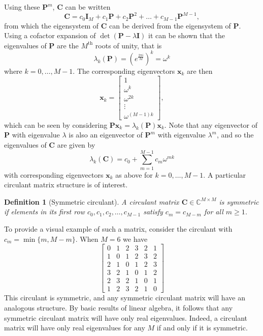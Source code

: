 \documentclass[letterpaper,12pt,oneside,final]{article}
\newtheorem{definition}{Definition}
\newcommand{\ve}[1]{\mathbf{#1}}           %
\newcommand{\m}[1]{\mathbf{#1}}               %
\newcommand{\field}[1]{\mathbb{#1}}
\newcommand{\Complex}{\field{C}}
\begin{document}
Using these $\m{P}^m$, $\m{C}$ can be written
\begin{equation} \label{eq:circMatPol}
  \m{C} = c_0 \m{I}_M + c_1 \m{P} + c_2 \m{P}^2 + \dots + c_{M-1} \m{P}^{M-1},
\end{equation}
from which the eigensystem of $\m{C}$ can be derived from the eigensystem of $\m{P}$. Using a cofactor expansion of $\det (\m{P} - \lambda \m{I})$ it can be shown that the eigenvalues of $\m{P}$ are the $M^{\text{th}}$ roots of unity, that is
$$\lambda_k (\m{P}) = \left ( e^{\frac{2 \pi i}{M}} \right )^k = \omega^k$$
where $k = 0, \dots, M-1$. The corresponding eigenvectors $\ve{x}_k$ are then
\begin{equation} \label{eq:multipleTesting:circEigenVec}
  \ve{x}_k = \begin{bmatrix}
  1 \\
  \omega^k \\
  \omega^{2k} \\
  \vdots \\
  \omega^{(M-1)k}
\end{bmatrix},
\end{equation}
which can be seen by considering $\m{P} \ve{x}_k = \lambda_k(\m{P}) \ve{x}_k$. Note that any eigenvector of $\m{P}$ with eigenvalue $\lambda$ is also an eigenvector of $\m{P}^m$ with eigenvalue $\lambda^m$, and so the eigenvalues of $\m{C}$ are given by
\begin{equation} \label{eq:multipleTesting:circEigenVals}
  \lambda_k (\m{C}) = c_0 + \sum_{m = 1}^{M-1} c_m \omega^{mk}
\end{equation}
with corresponding eigenvectors $\ve{x}_k$ as above for $k = 0, \dots, M-1$. A particular circulant matrix structure is of interest.

\begin{definition}[Symmetric circulant] \label{def:symmCirc}
  A circulant matrix $\m{C} \in \Complex^{M \times M}$ is symmetric if elements in its first row $c_0, c_1, c_2, \dots, c_{M-1}$ satisfy $c_m = c_{M-m}$ for all $m \geq 1$.
\end{definition}

To provide a visual example of such a matrix, consider the circulant with $c_m = \min \{m, M-m\}$. When $M = 6$ we have
$$\begin{bmatrix}
  0 & 1 & 2 & 3 & 2 & 1 \\
  1 & 0 & 1 & 2 & 3 & 2 \\
  2 & 1 & 0 & 1 & 2 & 3 \\
  3 & 2 & 1 & 0 & 1 & 2 \\
  2 & 3 & 2 & 1 & 0 & 1 \\
  1 & 2 & 3 & 2 & 1 & 0
\end{bmatrix}$$
This circulant is symmetric, and any symmetric circulant matrix will have an analogous structure. By basic results of linear algebra, it follows that any symmetric circulant matrix will have only real eigenvalues. Indeed, a circulant matrix will have only real eigenvalues for any $M$ if and only if it is symmetric.
\end{document}
